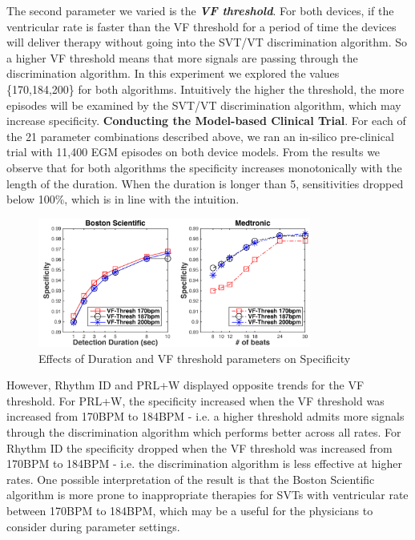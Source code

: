 The second parameter we varied is the \emph{\textbf{VF threshold}}.
For both devices, if the ventricular rate is faster than the VF threshold for a period of time the devices will deliver therapy without going into the SVT/VT discrimination algorithm. So a higher VF threshold means that more signals are passing through the discrimination algorithm.
In this experiment we explored the values \{170,184,200\} for both algorithms.
Intuitively the higher the threshold, the more episodes will be examined by the SVT/VT discrimination algorithm, which may increase specificity.
\newline\textbf{Conducting the Model-based Clinical Trial}. 
For each of the 21 parameter combinations described above, we ran an in-silico pre-clinical trial with 11,400 EGM episodes on both device models. 
From the results we observe that for both algorithms the specificity increases monotonically with the length of the duration.
When the duration is longer than 5, sensitivities dropped below 100\%, which is in line with the intuition.
\begin{figure}[t]
	
		\centering
		\includegraphics[width=0.8\textwidth]{figs/parameter.pdf}
		\caption{\small Effects of Duration and VF threshold parameters on Specificity}
		\label{fig:parameter}
\end{figure}
However, Rhythm ID and PRL+W displayed opposite trends for the VF threshold.
For PRL+W, the specificity increased when the VF threshold was increased from 170BPM to 184BPM - i.e. a higher threshold admits more signals through the discrimination algorithm which performs better across all rates.
For Rhythm ID the specificity dropped when the VF threshold was increased from 170BPM to 184BPM - i.e. the discrimination algorithm is less effective at higher rates. 
One possible interpretation of the result is that the Boston Scientific algorithm is more prone to inappropriate therapies for SVTs with ventricular rate between 170BPM to 184BPM, which may be a useful for the physicians to consider during parameter settings. 



